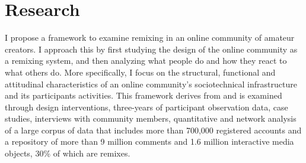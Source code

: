 \section{Research}

I propose a framework to examine remixing in an online community of amateur creators. 
I approach this by first studying the design of the online community as a remixing system, and then analyzing what people do and how they react to what others do.
More specifically, I focus on the structural, functional and attitudinal characteristics of an online community's sociotechnical infrastructure and its participants activities.
This framework derives from and is examined through design interventions, three-years of participant observation data, case studies, interviews with community members, quantitative and network analysis of a large corpus of data that includes more than 700,000 registered accounts and a repository of more than 9 million comments and 1.6 million interactive media objects, 30\% of which are remixes.







